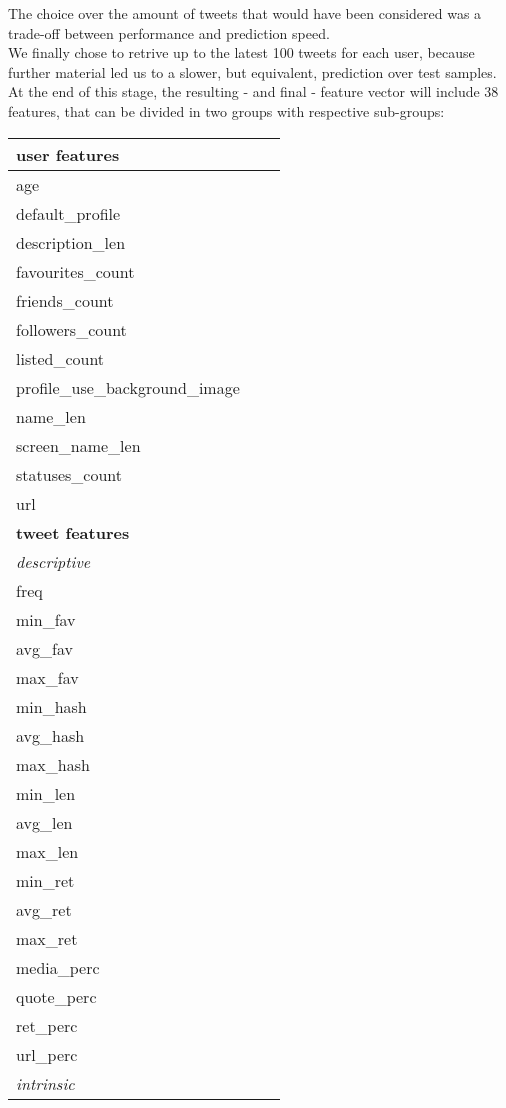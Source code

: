 The choice over the amount of tweets that would have been considered was a trade-off between performance and prediction speed.\\
We finally chose to retrive up to the latest 100 tweets for each user, because further material led us to a slower, but equivalent, prediction over test samples.\\
At the end of this stage, the resulting - and final - feature vector will include 38 features, that can be divided in two groups with respective sub-groups:
\small
\begin{center}
	\begin{tabular}{lll}
		\hline\hline
		\textbf{user features}\\
		\hline\hline
		age\\
		default\_profile\\
		description\_len\\
		favourites\_count\\
		friends\_count\\
		followers\_count\\
		listed\_count\\
		profile\_use\_background\_image\\
		name\_len\\
		screen\_name\_len\\
		statuses\_count\\
		url\\
		\hline\hline
		\textbf{tweet  features}\\
		\hline\hline
		\textit{descriptive}\\
		\hline
		freq\\
		min\_fav\\
		avg\_fav\\
		max\_fav\\
		min\_hash\\
		avg\_hash\\
		max\_hash\\
		min\_len\\
		avg\_len\\
		max\_len\\
		min\_ret\\
		avg\_ret\\
		max\_ret\\
		media\_perc\\
		quote\_perc\\
		ret\_perc\\
		url\_perc\\
		\hline
		\textit{intrinsic}\\

\end{tabular}
\end{center}
